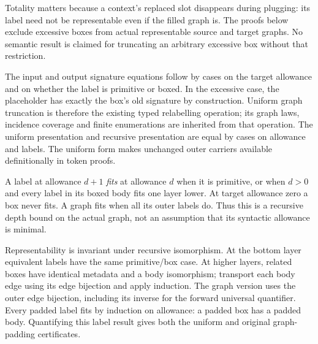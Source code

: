 Totality matters because a context's replaced slot disappears during plugging:
its label need not be representable even if the filled graph is. The proofs
below exclude excessive boxes from actual representable source and target
graphs. No semantic result is claimed for truncating an arbitrary excessive
box without that restriction.




The input and output signature equations follow by cases on the target
allowance and on whether the label is primitive or boxed. In the excessive
case, the placeholder has exactly the box's old signature by construction.
Uniform graph truncation is therefore the existing typed relabelling
operation; its graph laws, incidence coverage and finite enumerations are
inherited from that operation. The uniform presentation and recursive
presentation are equal by cases on allowance and labels. The uniform form
makes unchanged outer carriers available definitionally in token proofs.





A label at allowance $d+1$ \emph{fits} at allowance $d$ when it is primitive,
or when $d>0$ and every label in its boxed body fits one layer lower.
At target allowance zero a box never fits. A graph fits when all its outer
labels do. Thus this is a recursive depth bound on the actual graph, not an
assumption that its syntactic allowance is minimal.

Representability is invariant under recursive isomorphism. At the bottom
layer equivalent labels have the same primitive/box case. At higher layers,
related boxes have identical metadata and a body isomorphism; transport each
body edge using its edge bijection and apply induction. The graph version
uses the outer edge bijection, including its inverse for the forward
universal quantifier. Every padded label fits by induction on allowance:
a padded box has a padded body. Quantifying this label result gives both
the uniform and original graph-padding certificates.

